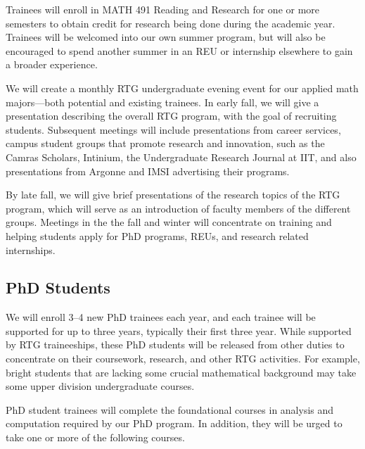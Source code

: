 \documentclass[11pt]{NSFamsart}
\begin{document}
Trainees will enroll in MATH 491 Reading and Research for one or more semesters to obtain credit for research being done during the academic year.  Trainees will be welcomed into our own summer program, but will also be encouraged to spend another summer in an REU or internship elsewhere to gain a broader experience.

We will create a monthly RTG undergraduate evening event for our applied math majors---both potential and existing trainees.  In early fall, we will give a presentation describing the overall RTG program, with the goal of recruiting students. Subsequent meetings will include presentations from   career services, campus student groups that promote research and innovation, such as the Camras Scholars, Intinium, the Undergraduate Research Journal at IIT, and also presentations from Argonne and IMSI advertising their programs. 

By late fall, we will give brief presentations of the research topics of the RTG program, which will serve as an introduction of faculty members of the different
groups. Meetings in the the fall and winter will concentrate on training and helping students apply for PhD programs, REUs, and research related internships. 



\subsection*{PhD Students}


We will enroll 3--4 new PhD trainees each year, and each trainee will be supported for up to three years, typically their first three year.  While supported by RTG traineeships, these PhD students will be released from other duties to concentrate on their coursework, research, and other RTG activities.  For example, bright students that are lacking some crucial mathematical background may take some upper division undergraduate courses.  

PhD student trainees will complete the foundational courses in analysis and computation required by our PhD program.  In addition, they will be urged to take one or more of the following courses.
\end{document}
